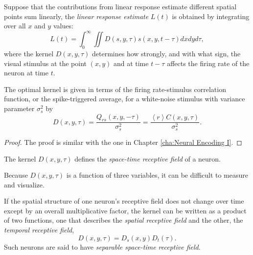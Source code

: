\begin{defn}
  \label{def:linearResponseEstimate}
  Suppose that the contributions from linear response estimate different spatial points sum linearly, the \emph{linear response estimate} $L(t)$ is obtained by integrating over all $x$ and $y$ values:
  \begin{equation}
    \label{equ:2.24}
    L(t) = \int_0^{\infty}\iint D(s,y,\tau)s(x,y,t-\tau)dxdyd\tau,
  \end{equation}
  where the kernel $D(x,y,\tau)$ determines how strongly, and with what sign, the visual stimulus at the point $(x,y)$ and at time $t-\tau$ affects the firing rate of the neuron at time $t$.
\end{defn}

\begin{prop}
  The optimal kernel is given in terms of the firing rate-stimulus correlation function, or the spike-triggered average, for a white-noise stimulus with variance parameter $\sigma_s^2$ by
  \begin{equation}
    \label{equ:2.25}
    D(x,y,\tau) = \frac{Q_{rs}(x,y,-\tau)}{\sigma_s^2} = \frac{\left<r\right>C(x,y,\tau)}{\sigma_s^2}.
  \end{equation}
\end{prop}
\begin{proof}
  The proof is similar with the one in Chapter \ref{cha:Neural Encoding I}.
\end{proof}

\begin{defn}
  \label{def:space-timeReceptiveField}
  The kernel $D(x,y,\tau)$ defines the \emph{space-time receptive field} of a neuron.
\end{defn}

\begin{rem}
  Because $D(x,y,\tau)$ is a function of three variables, it can be difficult to measure and visualize.
\end{rem}

\begin{defn}
  \label{def:separableReceptiveField}
  If the spatial structure of one neuron's receptive field does not change over time except by an overall multiplicative factor, the kernel can be written as a product of two functions, one that describes the \emph{spatial receptive field} and the other, the \emph{temporal receptive field},
  \begin{equation}
    \label{equ:2.26}
    D(x,y,\tau) = D_s(x,y)D_t(\tau).
  \end{equation}
  Such neurons are said to have \emph{separable space-time receptive field}.
\end{defn}

